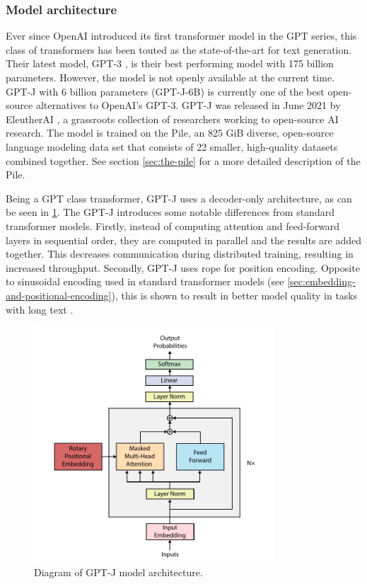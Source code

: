\subsubsection{Model architecture}
\label{sec:architecture}
Ever since OpenAI introduced its first transformer model in the GPT series, this class of transformers has been touted as the state-of-the-art for text generation. Their latest model, GPT-3 \cite{brown2020language}, is their best performing model with 175 billion parameters. However, the model is not openly available at the current time. GPT-J \cite{gpt-j} with 6 billion parameters (GPT-J-6B) is currently one of the best open-source alternatives to OpenAI's GPT-3. GPT-J was released in June 2021 by EleutherAI \cite{eleutherai}, a grassroots collection of researchers working to open-source AI research. The model is trained on the Pile, an 825 GiB diverse, open-source language modeling data set that consists of 22 smaller, high-quality datasets combined together. See section \cref{sec:the-pile} for a more detailed description of the Pile.

Being a GPT class transformer, GPT-J uses a decoder-only architecture, as can be seen in \cref{fig:gpt-j-architecture}. The GPT-J introduces some notable differences from standard transformer models. Firstly, instead of computing attention and feed-forward layers in sequential order, they are computed in parallel and the results are added together. This decreases communication during distributed training, resulting in increased throughput. Secondly, GPT-J uses \acrfull{rope} \cite{su2021roformer} for position encoding. Opposite to sinusoidal encoding used in standard transformer models (see \cref{sec:embedding-and-positional-encoding}), this is shown to result in better model quality in tasks with long text \cite{su2021roformer}.

\begin{figure}[htbp]
    \centering
    \includegraphics[width=0.8\textwidth]{figures/gpt-j_architecture.pdf}
    \caption{Diagram of GPT-J model architecture.}
    \label{fig:gpt-j-architecture}
\end{figure}

